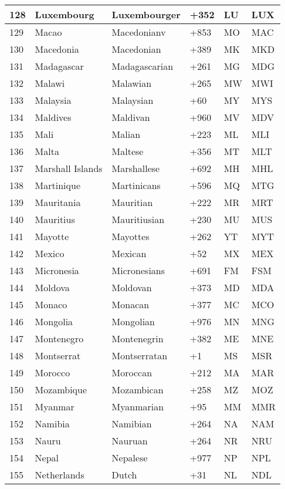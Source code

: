 \begin{longtable}{|l|l|l|l|l|l|}
128 & Luxembourg & Luxembourger & +352 & LU & LUX \\ \hline 
129 & Macao & Macedonianv & +853 & MO & MAC \\ \hline 
130 & Macedonia & Macedonian & +389 & MK & MKD \\ \hline 
131 & Madagascar & Madagascarian & +261 & MG & MDG \\ \hline 
132 & Malawi & Malawian & +265 & MW & MWI \\ \hline 
133 & Malaysia & Malaysian & +60 & MY & MYS \\ \hline 
134 & Maldives & Maldivan & +960 & MV & MDV \\ \hline 
135 & Mali & Malian & +223 & ML & MLI \\ \hline 
136 & Malta & Maltese & +356 & MT & MLT \\ \hline 
137 & Marshall Islands & Marshallese & +692 & MH & MHL \\ \hline 
138 & Martinique & Martinicans & +596 & MQ & MTG \\ \hline 
139 & Mauritania & Mauritian & +222 & MR & MRT \\ \hline 
140 & Mauritius & Mauritiusian & +230 & MU & MUS \\ \hline 
141 & Mayotte & Mayottes & +262 & YT & MYT \\ \hline 
142 & Mexico & Mexican & +52 & MX & MEX \\ \hline 
143 & Micronesia & Micronesians & +691 & FM & FSM \\ \hline 
144 & Moldova & Moldovan & +373 & MD & MDA \\ \hline 
145 & Monaco & Monacan & +377 & MC & MCO \\ \hline 
146 & Mongolia & Mongolian & +976 & MN & MNG \\ \hline 
147 & Montenegro & Montenegrin & +382 & ME & MNE \\ \hline 
148 & Montserrat & Montserratan & +1 & MS & MSR \\ \hline 
149 & Morocco & Moroccan & +212 & MA & MAR \\ \hline 
150 & Mozambique & Mozambican & +258 & MZ & MOZ \\ \hline 
151 & Myanmar & Myanmarian & +95 & MM & MMR \\ \hline 
152 & Namibia & Namibian & +264 & NA & NAM \\ \hline 
153 & Nauru & Nauruan & +264 & NR & NRU \\ \hline 
154 & Nepal & Nepalese & +977 & NP & NPL \\ \hline 
155 & Netherlands & Dutch & +31 & NL & NDL \\ \hline 

\end{longtable}
